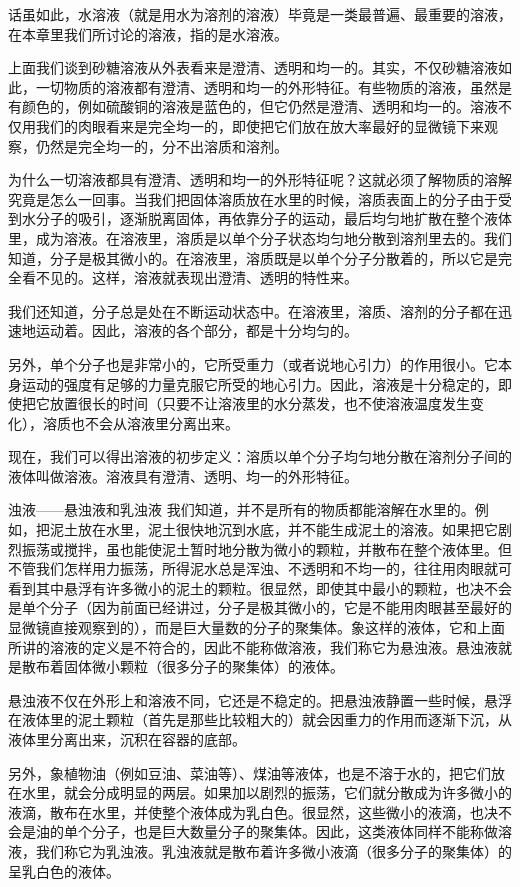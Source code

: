 话虽如此，水溶液（就是用水为溶剂的溶液）毕竟是一类最普遍、最重要的溶液，在本章里我们所讨论的溶液，指的是水溶液。

上面我们谈到砂糖溶液从外表看来是澄清、透明和均一的。其实，不仅砂糖溶液如此，一切物质的溶液都有澄清、透明和均一的外形特征。有些物质的溶液，虽然是有颜色的，例如硫酸铜的溶液是蓝色的，但它仍然是澄清、透明和均一的。溶液不仅用我们的肉眼看来是完全均一的，即使把它们放在放大率最好的显微镜下来观察，仍然是完全均一的，分不出溶质和溶剂。

为什么一切溶液都具有澄清、透明和均一的外形特征呢？这就必须了解物质的溶解究竟是怎么一回事。当我们把固体溶质放在水里的时候，溶质表面上的分子由于受到水分子的吸引，逐渐脱离固体，再依靠分子的运动，最后均匀地扩散在整个液体里，成为溶液。在溶液里，溶质是以单个分子状态均匀地分散到溶剂里去的。我们知道，分子是极其微小的。在溶液里，溶质既是以单个分子分散着的，所以它是完全看不见的。这样，溶液就表现出澄清、透明的特性来。

我们还知道，分子总是处在不断运动状态中。在溶液里，溶质、溶剂的分子都在迅速地运动着。因此，溶液的各个部分，都是十分均匀的。

另外，单个分子也是非常小的，它所受重力（或者说地心引力）的作用很小。它本身运动的强度有足够的力量克服它所受的地心引力。因此，溶液是十分稳定的，即使把它放置很长的时间（只要不让溶液里的水分蒸发，也不使溶液温度发生变化），溶质也不会从溶液里分离出来。

现在，我们可以得出溶液的初步定义：溶质以单个分子均匀地分散在溶剂分子间的液体叫做溶液。溶液具有澄清、透明、均一的外形特征。

浊液------悬浊液和乳浊液
我们知道，并不是所有的物质都能溶解在水里的。例如，把泥土放在水里，泥土很快地沉到水底，并不能生成泥土的溶液。如果把它剧烈振荡或搅拌，虽也能使泥土暂时地分散为微小的颗粒，并散布在整个液体里。但不管我们怎样用力振荡，所得泥水总是浑浊、不透明和不均一的，往往用肉眼就可看到其中悬浮有许多微小的泥土的颗粒。很显然，即使其中最小的颗粒，也决不会是单个分子（因为前面已经讲过，分子是极其微小的，它是不能用肉眼甚至最好的显微镜直接观察到的），而是巨大量数的分子的聚集体。象这样的液体，它和上面所讲的溶液的定义是不符合的，因此不能称做溶液，我们称它为悬浊液。悬浊液就是散布着固体微小颗粒（很多分子的聚集体）的液体。

悬浊液不仅在外形上和溶液不同，它还是不稳定的。把悬浊液静置一些时候，悬浮在液体里的泥土颗粒（首先是那些比较粗大的）就会因重力的作用而逐渐下沉，从液体里分离出来，沉积在容器的底部。

另外，象植物油（例如豆油、菜油等）、煤油等液体，也是不溶于水的，把它们放在水里，就会分成明显的两层。如果加以剧烈的振荡，它们就分散成为许多微小的液滴，散布在水里，并使整个液体成为乳白色。很显然，这些微小的液滴，也决不会是油的单个分子，也是巨大数量分子的聚集体。因此，这类液体同样不能称做溶液，我们称它为乳浊液。乳浊液就是散布着许多微小液滴（很多分子的聚集体）的呈乳白色的液体。

